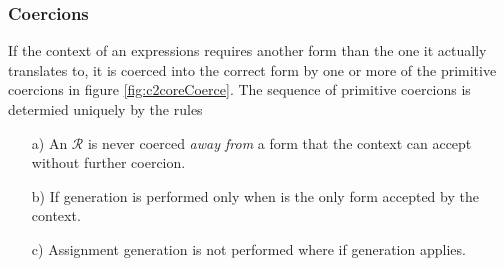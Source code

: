 \begin{docpart}
\subsubsection{Coercions}
If the context of an expressions requires another form than
the one it actually translates to, it is coerced into the
correct form by one or more of the primitive coercions in
figure \vref{fig:c2coreCoerce}. The sequence of primitive
coercions is determied uniquely by the rules
\begin{itemize}
\item[a)] An $\mathcal R$ is never coerced \emph{away from} a form
        that the context can accept without further coercion.
\item[b)] If generation is performed only when 
        is the only form accepted by the context.
\item[c)] Assignment generation is not performed where if generation
        applies.
\end{itemize}


\end{docpart}
